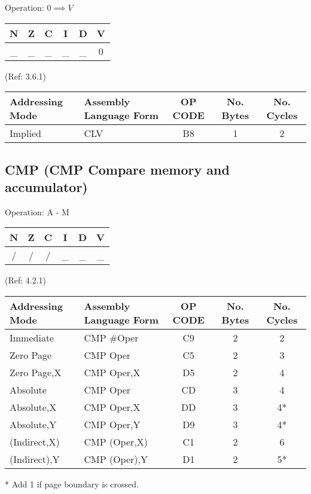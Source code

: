 \documentclass{article}
\begin{document}
  Operation: $0 \implies V$
  \begin{table}[H]
  \centering
  \begin{tabular}{|c c c c c c|}
  \hline
  N&Z&C&I&D&V\\
  \hline
  \_ & \_ & \_ & \_ & \_ & 0\\
  \hline
  \end{tabular}
  \end{table}
                                (Ref: 3.6.1)
  \begin{table}[H]
  \centering
  \begin{tabular}{|l|l|c|c|c|}
  \hline
   Addressing Mode& Assembly Language Form& OP CODE &No. Bytes&No. Cycles\\
  \hline
    Implied       &   CLV                 &    B8   &    1    &    2     \\
  \hline
  \end{tabular}
  \end{table}

  \subsection{CMP (CMP Compare memory and accumulator)}

  Operation:  A - M
  \begin{table}[H]
  \centering
  \begin{tabular}{|c c c c c c|}
  \hline
  N&Z&C&I&D&V\\
  \hline
  / & / & / & \_ & \_ & \_\\
  \hline
  \end{tabular}
  \end{table}
                                (Ref: 4.2.1)
  \begin{table}[H]
  \centering
  \begin{tabular}{|l|l|c|c|c|}
  \hline
   Addressing Mode& Assembly Language Form& OP CODE &No. Bytes&No. Cycles\\
  \hline
    Immediate     &   CMP \#Oper          &    C9   &    2    &    2     \\
    Zero Page     &   CMP Oper            &    C5   &    2    &    3     \\
    Zero Page,X   &   CMP Oper,X          &    D5   &    2    &    4     \\
    Absolute      &   CMP Oper            &    CD   &    3    &    4     \\
    Absolute,X    &   CMP Oper,X          &    DD   &    3    &    4*    \\
    Absolute,Y    &   CMP Oper,Y          &    D9   &    3    &    4*    \\
    (Indirect,X)  &   CMP (Oper,X)        &    C1   &    2    &    6     \\
    (Indirect),Y  &   CMP (Oper),Y        &    D1   &    2    &    5*    \\
  \hline
  \end{tabular}
  \end{table}
  * Add 1 if page boundary is crossed.
\end{document}
